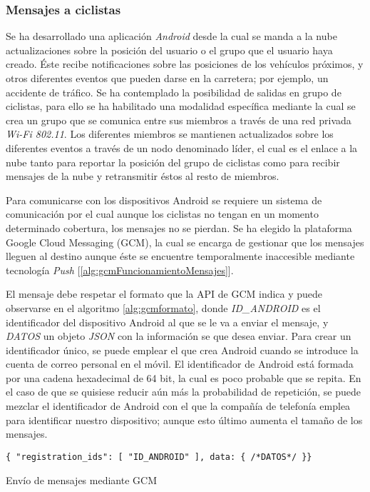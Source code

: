 \subsubsection{Mensajes a ciclistas}\label{sssection:mensajes_ciclistas}
Se ha desarrollado una aplicación \emph{Android} desde la cual se manda a la nube actualizaciones sobre la posición del usuario o el grupo que el usuario haya creado. \'Este recibe notificaciones sobre las posiciones de los vehículos próximos, y otros diferentes eventos que pueden darse en la carretera; por ejemplo, un accidente de tráfico. Se ha contemplado la posibilidad de salidas en grupo de ciclistas, para ello se ha habilitado una modalidad específica mediante la cual se crea un grupo que se comunica entre sus miembros a través de una red privada \emph{Wi-Fi 802.11}. Los diferentes miembros se mantienen actualizados sobre los diferentes eventos a través de un nodo denominado líder, el cual es el enlace a la nube tanto para reportar la posición del grupo de ciclistas como para recibir mensajes de la nube y retransmitir éstos al resto de miembros.

Para comunicarse con los dispositivos Android se requiere un sistema de comunicación por el cual aunque los ciclistas no tengan en un momento determinado cobertura, los mensajes no se pierdan. Se ha elegido la plataforma Google Cloud Messaging (GCM), la cual se encarga de gestionar que los mensajes lleguen al destino aunque éste se encuentre temporalmente inaccesible mediante tecnología \emph{Push} [\ref{alg:gcmFuncionamientoMensajes}]. 

El mensaje debe respetar el formato que la API de GCM indica y puede observarse en el algoritmo \ref{alg:gcmformato}, donde \emph{ID\_ANDROID} es el identificador del dispositivo Android al que se le va a enviar el mensaje, y \emph{DATOS} un objeto \emph{JSON} con la información se que desea enviar. Para crear un identificador único, se puede emplear el que crea Android cuando se introduce la cuenta de correo personal en el móvil. El identificador de Android está formada por una cadena hexadecimal de 64 bit, la cual es poco probable que se repita. En el caso de que se quisiese reducir aún más la probabilidad de repetición, se puede mezclar el identificador de Android con el que la compañía de telefonía emplea para identificar nuestro dispositivo; aunque esto último aumenta el tamaño de los mensajes.

\begin{listing}
	\begin{minipage}{.4\textwidth}
		\begin{verbatim}
{ "registration_ids": [ "ID_ANDROID" ], data: { /*DATOS*/ }}
		\end{verbatim}
	\end{minipage}
	\caption{Envío de mensajes mediante GCM}\label{alg:gcmformato}
\end{listing}

